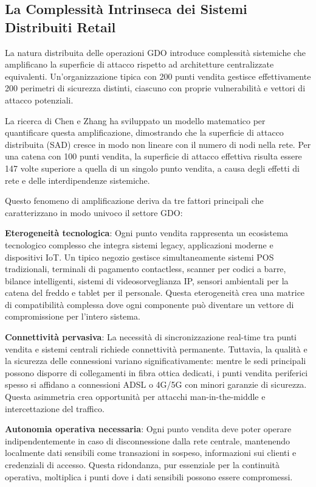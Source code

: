 \subsection{La Complessità Intrinseca dei Sistemi Distribuiti Retail}

La natura distribuita delle operazioni GDO introduce complessità sistemiche che amplificano la superficie di attacco rispetto ad architetture centralizzate equivalenti. Un'organizzazione tipica con 200 punti vendita gestisce effettivamente 200 perimetri di sicurezza distinti, ciascuno con proprie vulnerabilità e vettori di attacco potenziali.

La ricerca di Chen e Zhang\autocite{chen2024} ha sviluppato un modello matematico per quantificare questa amplificazione, dimostrando che la superficie di attacco distribuita (SAD) cresce in modo non lineare con il numero di nodi nella rete. Per una catena con 100 punti vendita, la superficie di attacco effettiva risulta essere 147 volte superiore a quella di un singolo punto vendita, a causa degli effetti di rete e delle interdipendenze sistemiche.

Questo fenomeno di amplificazione deriva da tre fattori principali che caratterizzano in modo univoco il settore GDO:

\textbf{Eterogeneità tecnologica}: Ogni punto vendita rappresenta un ecosistema tecnologico complesso che integra sistemi legacy, applicazioni moderne e dispositivi IoT. Un tipico negozio gestisce simultaneamente sistemi POS tradizionali, terminali di pagamento contactless, scanner per codici a barre, bilance intelligenti, sistemi di videosorveglianza IP, sensori ambientali per la catena del freddo e tablet per il personale. Questa eterogeneità crea una matrice di compatibilità complessa dove ogni componente può diventare un vettore di compromissione per l'intero sistema.

\textbf{Connettività pervasiva}: La necessità di sincronizzazione real-time tra punti vendita e sistemi centrali richiede connettività permanente. Tuttavia, la qualità e la sicurezza delle connessioni variano significativamente: mentre le sedi principali possono disporre di collegamenti in fibra ottica dedicati, i punti vendita periferici spesso si affidano a connessioni ADSL o 4G/5G con minori garanzie di sicurezza. Questa asimmetria crea opportunità per attacchi man-in-the-middle e intercettazione del traffico.

\textbf{Autonomia operativa necessaria}: Ogni punto vendita deve poter operare indipendentemente in caso di disconnessione dalla rete centrale, mantenendo localmente dati sensibili come transazioni in sospeso, informazioni sui clienti e credenziali di accesso. Questa ridondanza, pur essenziale per la continuità operativa, moltiplica i punti dove i dati sensibili possono essere compromessi.

